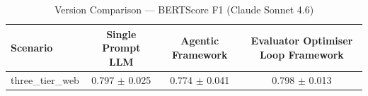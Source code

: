\begin{table}[htbp]
\centering
\caption{Version Comparison — BERTScore F1 (Claude Sonnet 4.6)}
\label{tab:version_bert_score_f1_claude}
\begin{tabular}{lccc}
\toprule
Scenario & Single Prompt LLM & Agentic Framework & Evaluator Optimiser Loop Framework \\
\midrule
three\_tier\_web & 0.797 $\pm$ 0.025 & 0.774 $\pm$ 0.041 & 0.798 $\pm$ 0.013 \\
\bottomrule
\end{tabular}
\end{table}